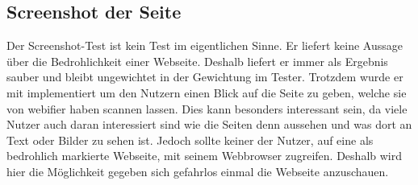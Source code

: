 \subsection{Screenshot der Seite}
Der Screenshot-Test ist kein Test im eigentlichen Sinne. Er liefert keine Aussage über die Bedrohlichkeit einer Webseite. Deshalb liefert er immer als Ergebnis sauber und bleibt ungewichtet in der Gewichtung im Tester. Trotzdem wurde er mit implementiert um den Nutzern einen Blick auf die Seite zu geben, welche sie von webifier haben scannen lassen. Dies kann besonders interessant sein, da viele Nutzer auch daran interessiert sind wie die Seiten denn aussehen und was dort an Text oder Bilder zu sehen ist. Jedoch sollte keiner der Nutzer, auf eine als bedrohlich markierte Webseite, mit seinem Webbrowser zugreifen. Deshalb wird hier die Möglichkeit gegeben sich gefahrlos einmal die Webseite anzuschauen.
